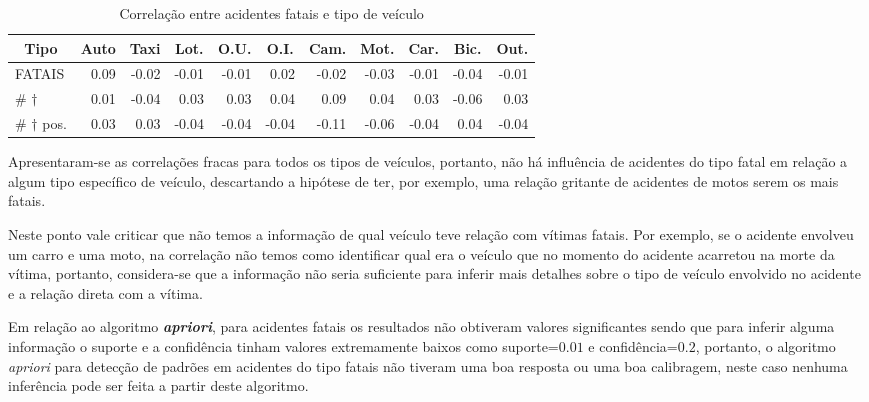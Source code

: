 \documentclass[11pt,article,oneside,a4paper]{abntex2}
\begin{document}
\begin{table}[ht]
\centering
\begin{small}
\caption{Correlação entre acidentes fatais e tipo de veículo} \label{tab:corr}
\begin{tabular}{l|r|r|r|r|r|r|r|r|r|r}
  \hline
\multicolumn{1}{c|}{\textbf{Tipo}} & \multicolumn{1}{c|}{\textbf{Auto}} & \multicolumn{1}{c|}{\textbf{Taxi}} & \multicolumn{1}{c|}{\textbf{Lot.}} & \multicolumn{1}{c|}{\textbf{O.U.}} & \multicolumn{1}{c|}{\textbf{O.I.}} & \multicolumn{1}{c|}{\textbf{Cam.}} & \multicolumn{1}{c|}{\textbf{Mot.}} & \multicolumn{1}{c|}{\textbf{Car.}} & \multicolumn{1}{c|}{\textbf{Bic.}} & \multicolumn{1}{c}{\textbf{Out.}} \\ \hline
FATAIS & 0.09 & -0.02 & -0.01 & -0.01 & 0.02 & -0.02 & -0.03 & -0.01 & -0.04 & -0.01 \\ 
\# $\dagger$ & 0.01 & -0.04 & 0.03 & 0.03 & 0.04 & 0.09 & 0.04 & 0.03 & -0.06 & 0.03 \\ 
\# $\dagger$ pos.& 0.03 & 0.03 & -0.04 & -0.04 & -0.04 & -0.11 & -0.06 & -0.04 & 0.04 & -0.04 \\ 
   \hline
\end{tabular}
\end{small}
\end{table}

Apresentaram-se as correlações fracas para todos os tipos de veículos, portanto, não há influência de acidentes do tipo fatal em relação a algum tipo específico de veículo, descartando a hipótese de ter, por exemplo, uma relação gritante de acidentes de motos serem os mais fatais. 

Neste ponto vale criticar que não temos a informação de qual veículo teve relação com vítimas fatais. Por exemplo, se o acidente envolveu um carro e uma moto, na correlação não temos como identificar qual era o veículo que no momento do acidente acarretou na morte da vítima, portanto, considera-se que a informação não seria suficiente para inferir mais detalhes sobre o tipo de veículo envolvido no acidente e a relação direta com a vítima.

Em relação ao algoritmo \textbf{\textit{apriori}}, para acidentes fatais os resultados não obtiveram valores significantes sendo que para inferir alguma informação o suporte e a confidência tinham valores extremamente baixos como suporte=$0.01$ e confidência=$0.2$, portanto, o algoritmo \textit{apriori} para detecção de padrões em acidentes do tipo fatais não tiveram uma boa resposta ou uma boa calibragem, neste caso nenhuma inferência pode ser feita a partir deste algoritmo.
\end{document}
